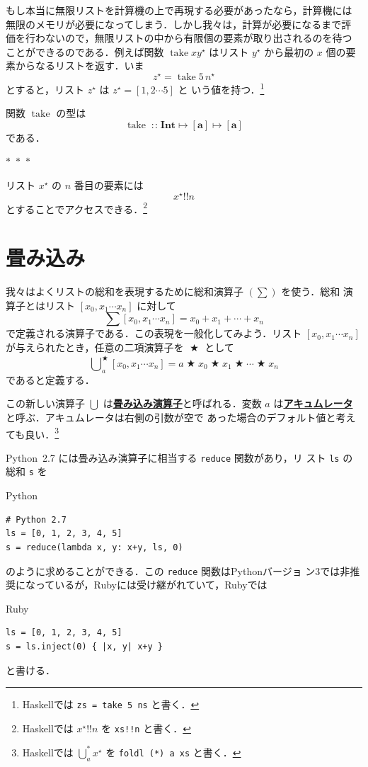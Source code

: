 \documentclass[a5paper,twoside,fleqn,draft]{jsbook}
\newcommand{\separator}{\begin{center}$*$~$*$~$*$\end{center}}
\newcommand{\programminglanguage}[1]{\textsf{#1}}
\newcommand{\haskell}{\programminglanguage{Haskell}}
\newcommand{\python}{\programminglanguage{Python}}
\newcommand{\ruby}{\programminglanguage{Ruby}}
\newcommand{\keyword}[1]{{\underline{\textbf{#1}}}}
\newcommand{\code}[1]{\texttt{#1}}
\newenvironment{pythoncode}{\begin{itembox}[r]{\python}}{\end{itembox}}
\newenvironment{rubycode}{\begin{itembox}[r]{\ruby}}{\end{itembox}}
\newcommand{\mSpecialFunc}[1]{#1}
\DeclareMathOperator{\mTake}{\mSpecialFunc{take}}
\DeclareMathOperator{\mBinOp}{\bigstar}
\DeclareMathOperator*{\mFold}{\bigcup}
\DeclareMathOperator{\mFuncArrow}{\mapsto}
\DeclareMathOperator{\mIn}{{:\!:}}
\DeclareMathOperator{\mListAt}{!!}
\newcommand{\mType}[1]{\mathbf{#1}} %
\newcommand{\mA}{\mType{a}}
\newcommand{\mIntType}{\mType{Int}}
\newcommand{\mList}[1]{{#1}^\mathrm{\star}}
\begin{document}
もし本当に無限リストを計算機の上で再現する必要があったなら，計算機には
無限のメモリが必要になってしまう．しかし我々は，計算が必要になるまで評
価を行わないので，無限リストの中から有限個の要素が取り出されるのを待つ
ことができるのである．例えば関数 $\mTake x\mList{y}$ はリスト
$\mList{y}$ から最初の $x$ 個の要素からなるリストを返す．いま
\begin{equation*}
  \mList{z}
  =\mTake5\,\mList{n}
\end{equation*}
とすると，リスト $\mList{z}$ は $\mList{z}=[1,2\dotsb5]$ と
いう値を持つ．\footnote{\haskell では \code{zs = take 5 ns} と書く．}

関数 $\mTake$ の型は
\begin{equation}
  \mTake
  \mIn\mIntType\mFuncArrow[\mA]\mFuncArrow[\mA]
\end{equation}
である．

\separator

リスト $\mList{x}$ の $n$ 番目の要素には
\begin{equation}
  \mList{x}\mListAt n
\end{equation}
とすることでアクセスできる．\footnote{\haskell では $\mList{x}\mListAt
  n$ を \code{xs!!n} と書く．}

\section{畳み込み}
\label{sec:convolution}

我々はよくリストの総和を表現するために総和演算子 $(\sum)$ を使う．総和
演算子とはリスト $[x_0,x_1\dotsb x_n]$ に対して
\begin{equation}
  \sum[x_0,x_1\dotsb x_n]
  =x_0+x_1+\dotsb+x_n
\end{equation}
で定義される演算子である．この表現を一般化してみよう．リスト
$[x_0,x_1\dotsb x_n]$ が与えられたとき，任意の二項演算子を
$\mBinOp$ として
\begin{equation}
  \mFold^{\mBinOp}_a[x_0,x_1\dotsb x_n]
  =a\mBinOp x_0\mBinOp x_1\mBinOp\dotsb\mBinOp x_n
\end{equation}
であると定義する．

この新しい演算子 $\mFold$ は\keyword{畳み込み演算子}と呼ばれる．変数
$a$ は\keyword{アキュムレータ}と呼ぶ．アキュムレータは右側の引数が空で
あった場合のデフォルト値と考えても良い．\footnote{\haskell では
  $\mFold^*_a\mList{x}$ を \code{foldl (*) a xs} と書く．}

\python\ 2.7 には畳み込み演算子に相当する \code{reduce} 関数があり，リ
スト \code{ls} の総和 \code{s} を
\begin{pythoncode}
\begin{verbatim}
# Python 2.7
ls = [0, 1, 2, 3, 4, 5]
s = reduce(lambda x, y: x+y, ls, 0)
\end{verbatim}
\end{pythoncode}
のように求めることができる．この \code{reduce} 関数は\python バージョ
ン3では非推奨になっているが，\ruby には受け継がれていて，\ruby では
\begin{rubycode}
\begin{verbatim}
ls = [0, 1, 2, 3, 4, 5]
s = ls.inject(0) { |x, y| x+y }
\end{verbatim}
\end{rubycode}
と書ける．
\end{document}

